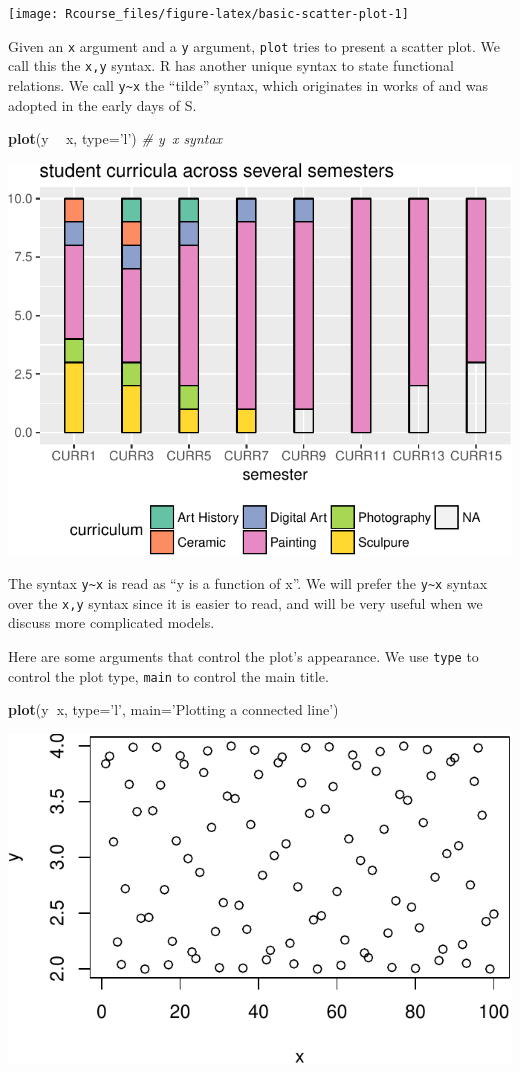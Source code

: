 \documentclass[]{book}
\newenvironment{Shaded}{\begin{snugshade}}{\end{snugshade}}
\newcommand{\CommentTok}[1]{\textcolor[rgb]{0.56,0.35,0.01}{\textit{#1}}}
\newcommand{\DataTypeTok}[1]{\textcolor[rgb]{0.13,0.29,0.53}{#1}}
\newcommand{\KeywordTok}[1]{\textcolor[rgb]{0.13,0.29,0.53}{\textbf{#1}}}
\newcommand{\NormalTok}[1]{#1}
\newcommand{\OperatorTok}[1]{\textcolor[rgb]{0.81,0.36,0.00}{\textbf{#1}}}
\newcommand{\StringTok}[1]{\textcolor[rgb]{0.31,0.60,0.02}{#1}}
\theoremstyle{definition}
\theoremstyle{definition}
\theoremstyle{definition}
\theoremstyle{remark}
\begin{document}
\texttt{[image: Rcourse\_files/figure-latex/basic-scatter-plot-1]}

Given an \texttt{x} argument and a \texttt{y} argument, \texttt{plot} tries to present a scatter plot.
We call this the \texttt{x,y} syntax.
R has another unique syntax to state functional relations.
We call \texttt{y\textasciitilde{}x} the ``tilde'' syntax, which originates in works of \citet{wilkinson1973symbolic} and was adopted in the early days of S.

\begin{Shaded}
\begin{Highlighting}[]
\KeywordTok{plot}\NormalTok{(y }\OperatorTok{~}\StringTok{ }\NormalTok{x, }\DataTypeTok{type=}\StringTok{'l'}\NormalTok{) }\CommentTok{# y~x syntax }
\end{Highlighting}
\end{Shaded}

\includegraphics[width=0.5\linewidth]{Rcourse_files/figure-latex/unnamed-chunk-32-1}

The syntax \texttt{y\textasciitilde{}x} is read as ``y is a function of x''.
We will prefer the \texttt{y\textasciitilde{}x} syntax over the \texttt{x,y} syntax since it is easier to read, and will be very useful when we discuss more complicated models.

Here are some arguments that control the plot's appearance.
We use \texttt{type} to control the plot type, \texttt{main} to control the main title.

\begin{Shaded}
\begin{Highlighting}[]
\KeywordTok{plot}\NormalTok{(y}\OperatorTok{~}\NormalTok{x, }\DataTypeTok{type=}\StringTok{'l'}\NormalTok{, }\DataTypeTok{main=}\StringTok{'Plotting a connected line'}\NormalTok{) }
\end{Highlighting}
\end{Shaded}

\includegraphics[width=0.5\linewidth]{Rcourse_files/figure-latex/unnamed-chunk-33-1}
\end{document}
